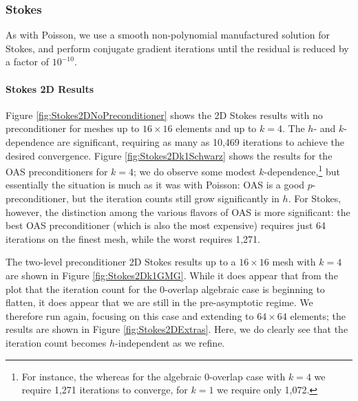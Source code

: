 \newcommand{\StokesThreeDSchwarzAlgebraicStartkOne}{31} %
\newcommand{\StokesThreeDSchwarzGeometricStartkOne}{43}
\newcommand{\StokesThreeDGMGSchwarzAlgebraicStartkOne}{7} %
\newcommand{\StokesThreeDGMGSchwarzGeometricStartkOne}{19}

\subsubsection{Stokes}
As with Poisson, we use a smooth non-polynomial manufactured solution for Stokes, and perform conjugate gradient iterations until the residual is reduced by a factor of $10^{-10}$.

\paragraph{Stokes 2D Results}
Figure \ref{fig:Stokes2DNoPreconditioner} shows the 2D Stokes results with no preconditioner for meshes up to $16 \times 16$ elements and up to $k=4$.  The $h$- and $k$-dependence are significant, requiring as many as 10,469 iterations to achieve the desired convergence.  Figure \ref{fig:Stokes2Dk1Schwarz} shows the results for the OAS preconditioners for $k=4$; we do observe some modest $k$-dependence,\footnote{For instance, the whereas for the algebraic 0-overlap case with $k=4$ we require 1,271 iterations to converge, for $k=1$ we require only 1,072.} but essentially the situation is much as it was with Poisson: OAS is a good $p$-preconditioner, but the iteration counts still grow significantly in $h$.  For Stokes, however, the distinction among the various flavors of OAS is more significant: the best OAS preconditioner (which is also the most expensive) requires just 64 iterations on the finest mesh, while the worst requires 1,271.

The two-level preconditioner 2D Stokes results up to a $16 \times 16$ mesh with $k=4$ are shown in Figure \ref{fig:Stokes2Dk1GMG}.  While it does appear that from the plot that the iteration count for the 0-overlap algebraic case is beginning to flatten, it does appear that we are still in the pre-asymptotic regime.  We therefore run again, focusing on this case and extending to $64 \times 64$ elements; the results are shown in Figure \ref{fig:Stokes2DExtras}.  Here, we do clearly see that the iteration count becomes $h$-independent as we refine. 

